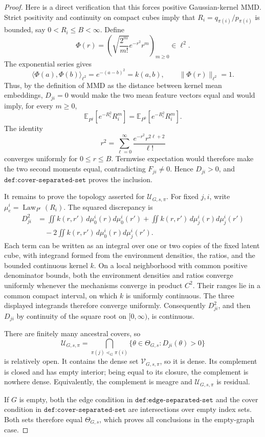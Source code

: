 \documentclass{article}
\begin{document}
\begin{proof}
Here is a direct verification that this forces positive Gaussian-kernel MMD. Strict positivity and continuity on compact cubes imply that \(R_i=q_{\pi(i)}/p_{\pi(i)}\) is bounded, say \(0<R_i\le B<\infty\). Define
\[
 \Phi(r)=\left(\sqrt{\frac{2^m}{m!}}e^{-r^2}r^m\right)_{m\ge0}\in\ell^2.
\]
The exponential series gives
\[
 \langle\Phi(a),\Phi(b)\rangle_{\ell^2}=e^{-(a-b)^2}=k(a,b),
 \qquad
 \|\Phi(r)\|_{\ell^2}=1.
\]
Thus, by the definition of MMD as the distance between kernel mean embeddings, \(D_{ji}=0\) would make the two mean feature vectors equal and would imply, for every \(m\ge0\),
\[
 \mathbb E_{P^j}[e^{-R_i^2}R_i^m]
 =\mathbb E_{P^0}[e^{-R_i^2}R_i^m].
\]
The identity
\[
 r^2=\sum_{\ell=0}^{\infty}\frac{e^{-r^2}r^{2\ell+2}}{\ell!}
\]
converges uniformly for \(0\le r\le B\). Termwise expectation would therefore make the two second moments equal, contradicting \(F_{ji}\ne0\). Hence \(D_{ji}>0\), and \(\texttt{def:cover-separated-set}\) proves the inclusion.

It remains to prove the topology asserted for \(\mathcal U_{G,s,\pi}\). For fixed \(j,i\), write \(\mu_e^i=\operatorname{Law}_{P^e}(R_i)\). The squared discrepancy is
\[
\begin{aligned}
 D_{ji}^2
 &=\iint k(r,r')\,d\mu_0^i(r)d\mu_0^i(r')
   +\iint k(r,r')\,d\mu_j^i(r)d\mu_j^i(r')\\
 &\quad-2\iint k(r,r')\,d\mu_0^i(r)d\mu_j^i(r').
\end{aligned}
\]
Each term can be written as an integral over one or two copies of the fixed latent cube, with integrand formed from the environment densities, the ratios, and the bounded continuous kernel \(k\). On a local neighborhood with common positive denominator bounds, both the environment densities and ratios converge uniformly whenever the mechanisms converge in product \(C^2\). Their ranges lie in a common compact interval, on which \(k\) is uniformly continuous. The three displayed integrands therefore converge uniformly. Consequently \(D_{ji}^2\), and then \(D_{ji}\) by continuity of the square root on \([0,\infty)\), is continuous.

There are finitely many ancestral covers, so
\[
 \mathcal U_{G,s,\pi}
 =\bigcap_{\pi(j)\lessdot_G\pi(i)}
   \{\theta\in\Theta_{G,s}:D_{ji}(\theta)>0\}
\]
is relatively open. It contains the dense set \(\mathcal V_{G,s,\pi}\), so it is dense. Its complement is closed and has empty interior; being equal to its closure, the complement is nowhere dense. Equivalently, the complement is meagre and \(\mathcal U_{G,s,\pi}\) is residual.

If \(G\) is empty, both the edge condition in \(\texttt{def:edge-separated-set}\) and the cover condition in \(\texttt{def:cover-separated-set}\) are intersections over empty index sets. Both sets therefore equal \(\Theta_{G,s}\), which proves all conclusions in the empty-graph case.
\end{proof}
\end{document}
